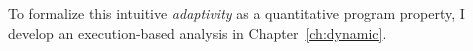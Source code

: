 \begin{enumerate}
To formalize this intuitive \emph{adaptivity} as a quantitative program property, 
I develop an execution-based analysis in Chapter~\ref{ch:dynamic}.

\end{enumerate}
